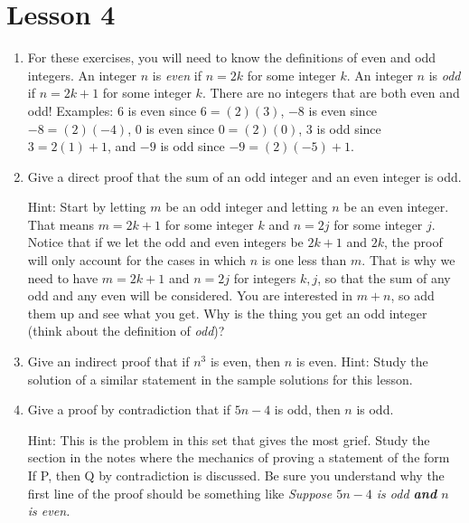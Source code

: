 \documentclass[11pt]{amsart}
\begin{document}
\section{Lesson 4}

\begin{enumerate}

\item [] For  these exercises, you will need to know the definitions of even and odd integers. 
 An integer $n$ is {\it even} if $n=2k$ for some integer $k$. An integer $n$ is {\it odd}
if $n=2k+1$ for some integer $k$. There are no integers that are both even and odd!
Examples: $6$ is even since $6 = (2)(3)$, $-8$ is even since $-8 = (2)(-4)$, $0$ is even since $0 = (2)(0)$, $3$ is odd since $3 = 2(1)+1$, and $-9$ is odd since $-9 = (2)(-5)+1$.\\[8pt]


\item Give a direct proof that the sum of  an odd integer and an even integer is odd. 

Hint: Start by letting $m$ be an odd integer and letting $n$ be an even integer. That means $m = 2k+1$ for some integer $k$ and $n = 2j$ for some integer $j$. Notice that if we let the odd and even integers be $2k+1$ and $2k$, the proof will only account for the cases in which $n$ is one less than $m$.
That is why we need to have $m = 2k+1$ and $n=2j$ for integers $k,j$, so that the sum of  any odd and any even will be considered. 
You are interested in $m+ n$, so add them up and see what you get.  Why is the thing you get an odd integer (think about the definition of {\it odd})?\\[5pt]

\item Give an  indirect proof that if $n^3$ is even, then $n$ is even. Hint: Study the solution of a similar statement in the sample solutions for this lesson.\\[5pt]


\item Give a proof by contradiction that if $5n-4$ is odd, then $n$ is odd.

Hint:  This is the problem in this set that gives the most grief.  Study the section
in  the  notes  where  the  mechanics  of  proving  a  statement  of  the  form
If P, then Q by contradiction is discussed.  Be sure you understand why the first line of the proof should be something like {\it Suppose $5n- 4$ is odd {\bfseries and} $n$ is even.}\\[5pt]


\end{enumerate}
\end{document}
